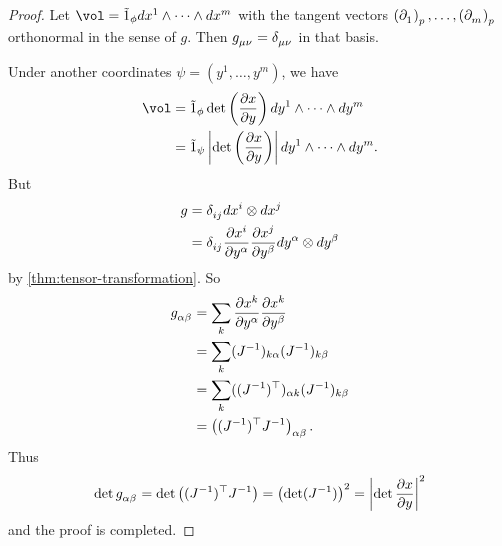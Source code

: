 \documentclass[../main.tex]{subfiles}
\begin{document}
    \begin{proof}
        Let \(\vol = \pseudo{1}_\phi dx^1\wedge\dots\wedge dx^m\) with the tangent 
        vectors \(\tvec{1}{p}, \dots, \tvec{m}{p}\) orthonormal in the sense of \(g\).
        Then \(g\indices{_\mu_\nu}=\delta\indices{_\mu_\nu}\) in that basis.\par
        Under another coordinates \(\psi=(y^1, \dots, y^m)\), we have 
        \[
        \begin{aligned}
            \vol &= \pseudo{1}_\phi \det \left(\frac{\partial x}{\partial y}\right)
            dy^1\wedge\dots\wedge dy^m \\
            &= \pseudo{1}_\psi \left|\det \left(\frac{\partial x}{\partial y}\right)\right|
            dy^1\wedge\dots\wedge dy^m.
        \end{aligned}
        \]
        But 
        \[
        \begin{aligned}
            g &= \delta\indices{_i_j}dx^i\otimes dx^j \\
            &= \delta\indices{_i_j}\frac{\partial x^i}{\partial y^\alpha}
            \frac{\partial x^j}{\partial y^\beta}dy^\alpha\otimes dy^\beta
        \end{aligned}
        \]
        by \cref{thm:tensor-transformation}. So 
        \[
        \begin{aligned}
            g\indices{_\alpha_\beta}&=\sum_{k} \frac{\partial x^k}{\partial y^\alpha}
            \frac{\partial x^k}{\partial y^\beta} \\
            &=\sum_{k} (J ^{-1})_{k\alpha}(J ^{-1})_{k\beta} \\
            &=\sum_{k} ((J ^{-1}) ^{\top})_{\alpha k}(J ^{-1})_{k\beta} \\
            &=\left((J ^{-1}) ^{\top}J ^{-1}\right)_{\alpha\beta}.
        \end{aligned}
        \]
        Thus 
        \[
        \det g\indices{_\alpha_\beta} = \det \left((J ^{-1}) ^{\top}J ^{-1}\right)
        =\left(\det (J ^{-1})\right)^2 = \left|\det \frac{\partial x}{\partial y}
        \right|^2
        \]
        and the proof is completed.
    \end{proof}
\end{document}
